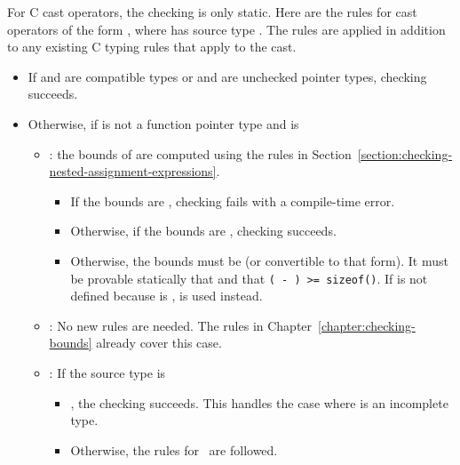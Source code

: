 For C cast operators, the checking is only static.
Here are the rules for cast operators of the form ,
where  has source type .  The rules are applied in addition
to any existing C typing rules that apply to the cast.
\begin{itemize}
\item If  and  are compatible types or  and  are unchecked
pointer types, checking succeeds.
\item Otherwise, if  is not a function pointer type and  is
\begin{itemize}
\item \ptrT: the bounds of  are computed using the rules
in Section~\ref{section:checking-nested-assignment-expressions}.
\begin{itemize}
\item If the bounds are \boundsunknown, checking fails with a compile-time
error.
\item Otherwise, if the bounds are \boundsany, checking 
succeeds.
\item Otherwise, the bounds must be  (or convertible
to that form).  It must be provable statically that  \code{>=} 
and that {\texttt{( - ) >= sizeof()}}.
If  is not defined because  is \void,  is
used instead.
\end{itemize}
\item \arrayptrT: No new rules are needed.   The rules in
Chapter~\ref{chapter:checking-bounds} already cover this case.
\item {} \code{*}: If the source type  is
\begin{itemize}
\item \ptrT, the checking succeeds. This handles the case where 
is an incomplete type.
\item Otherwise, the rules for \ptrT\ are followed.
\end{itemize}
\end{itemize}


\end{itemize}

